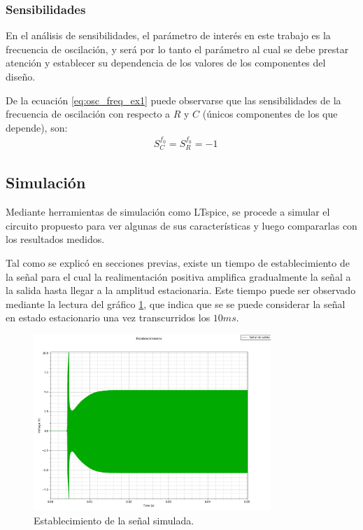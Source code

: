 \subsubsection{Sensibilidades}
En el análisis de sensibilidades, el parámetro de interés en este trabajo es la frecuencia de oscilación, y será por lo tanto el parámetro al cual se 
debe prestar atención y establecer su dependencia de los valores de los componentes del diseño.

De la ecuación \ref{eq:osc_freq_ex1} puede observarse que las sensibilidades de la frecuencia de oscilación con respecto a $R$ y $C$ (únicos componentes 
de los que depende), son:
\begin{align*}
    & S_C^{f_0} = S_R^{f_0} = -1
\end{align*}



\subsection{Simulación}
Mediante herramientas de simulación como LTspice, se procede a simular el circuito propuesto para ver algunas de sus características y luego compararlas 
con los resultados medidos.

Tal como se explicó en secciones previas, existe un tiempo de establecimiento de la señal para el cual la realimentación positiva amplifica gradualmente 
la señal a la salida hasta llegar a la amplitud estacionaria.
Este tiempo puede ser observado mediante la lectura del gráfico \ref{fig:time_ex1}, que 
indica que se se puede considerar la señal en estado estacionario una vez transcurridos los $10ms$.
\begin{figure}[H]
    \centering
    \includegraphics[width=0.8\textwidth]{../EJ1/Recursos/time.png}
    \caption{Establecimiento de la señal simulada.}
    \label{fig:time_ex1}    
\end{figure}

